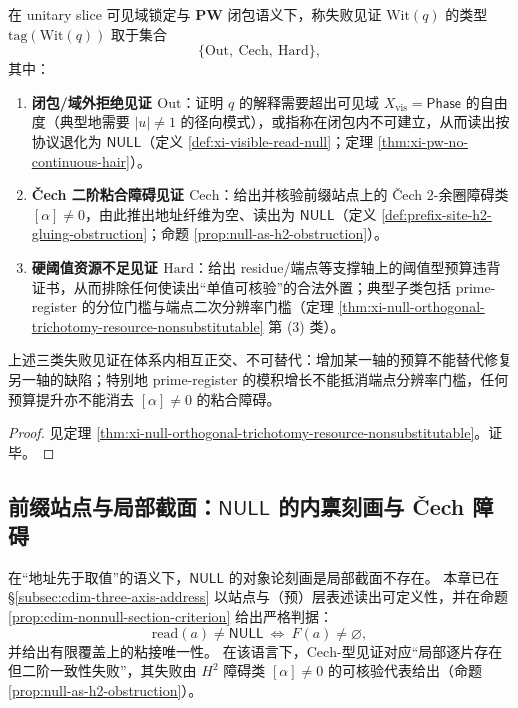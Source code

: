 \begin{definition}[失败见证的类型标签]\label{def:cdim-null-witness-tag}
在 unitary slice 可见域锁定与 \(\mathbf{PW}\) 闭包语义下，称失败见证 \(\mathrm{Wit}(q)\) 的类型
\(\mathrm{tag}(\mathrm{Wit}(q))\)
取于集合
\[
\{\mathrm{Out},\ \mathrm{Cech},\ \mathrm{Hard}\},
\]
其中：
\begin{enumerate}
  \item \textbf{闭包/域外拒绝见证 \(\mathrm{Out}\)}：证明 \(q\) 的解释需要超出可见域 \(X_{\mathrm{vis}}=\mathsf{Phase}\) 的自由度（典型地需要 \(|u|\neq 1\) 的径向模式），或指称在闭包内不可建立，从而读出按协议退化为 \(\mathsf{NULL}\)（定义 \ref{def:xi-visible-read-null}；定理 \ref{thm:xi-pw-no-continuous-hair}）。
  \item \textbf{\v{C}ech 二阶粘合障碍见证 \(\mathrm{Cech}\)}：给出并核验前缀站点上的 Čech \(2\)-余圈障碍类 \([\alpha]\neq 0\)，由此推出地址纤维为空、读出为 \(\mathsf{NULL}\)（定义 \ref{def:prefix-site-h2-gluing-obstruction}；命题 \ref{prop:null-as-h2-obstruction}）。
  \item \textbf{硬阈值资源不足见证 \(\mathrm{Hard}\)}：给出 residue/端点等支撑轴上的阈值型预算违背证书，从而排除任何使读出“单值可核验”的合法外置；典型子类包括 prime-register 的分位门槛与端点二次分辨率门槛（定理 \ref{thm:xi-null-orthogonal-trichotomy-resource-nonsubstitutable} 第 (3) 类）。
\end{enumerate}
\end{definition}

\begin{proposition}[不可替代性]\label{prop:cdim-null-witness-nonsubstitutable}
上述三类失败见证在体系内相互正交、不可替代：增加某一轴的预算不能替代修复另一轴的缺陷；特别地 prime-register 的模积增长不能抵消端点分辨率门槛，任何预算提升亦不能消去 \([\alpha]\neq 0\) 的粘合障碍。
\end{proposition}
\begin{proof}
见定理 \ref{thm:xi-null-orthogonal-trichotomy-resource-nonsubstitutable}。证毕。
\end{proof}

\subsection{前缀站点与局部截面：\texorpdfstring{$\mathsf{NULL}$}{NULL} 的内禀刻画与 \v{C}ech 障碍}\label{subsec:cdim-prefix-site-local-sections-null}
在“地址先于取值”的语义下，\(\mathsf{NULL}\) 的对象论刻画是局部截面不存在。
本章已在 \S\ref{subsec:cdim-three-axis-address} 以站点与（预）层表述读出可定义性，并在命题 \ref{prop:cdim-nonnull-section-criterion} 给出严格判据：
\[
\mathrm{read}(a)\neq \mathsf{NULL}\ \Longleftrightarrow\ F(a)\neq\varnothing,
\]
并给出有限覆盖上的粘接唯一性。
在该语言下，\(\mathrm{Cech}\)-型见证对应“局部逐片存在但二阶一致性失败”，其失败由 \(H^2\) 障碍类 \([\alpha]\neq 0\) 的可核验代表给出（命题 \ref{prop:null-as-h2-obstruction}）。


